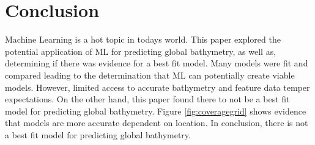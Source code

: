\section{Conclusion}
\setlength{\parindent}{10ex}
Machine Learning is a hot topic in todays world.
This paper explored the potential application of \ac{ML} for predicting global bathymetry, as well as, determining if there was evidence for a best fit model.
Many models were fit and compared leading to the determination that \ac{ML} can potentially create viable models.
However, limited access to accurate bathymetry and feature data temper expectations.
On the other hand, this paper found there to not be a best fit model for predicting global bathymetry. 
Figure \ref{fig:coveragegrid} shows evidence that models are more accurate dependent on location.
In conclusion, there is not a best fit model for predicting global bathymetry.